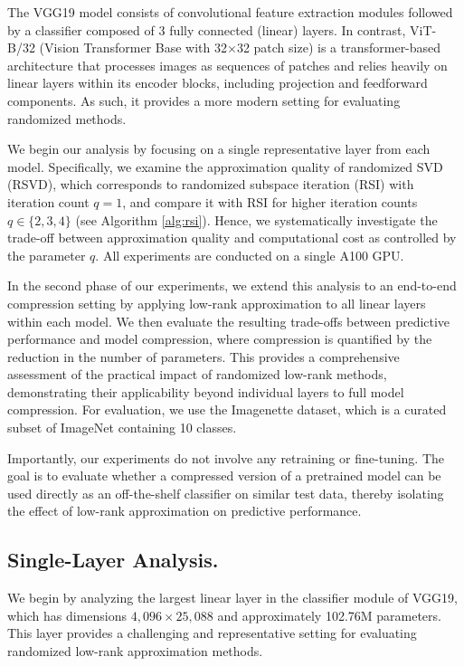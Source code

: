 \documentclass[twoside,leqno,onecolumn]{article}
\begin{document}
The VGG19 model consists of convolutional feature extraction modules followed by a classifier composed of 3 fully connected (linear) layers. In contrast, ViT-B/32 (Vision Transformer Base with 32$\times$32 patch size) is a transformer-based architecture that processes images as sequences of patches and relies heavily on linear layers within its encoder blocks, including projection and feedforward components. As such, it provides a  more modern setting for evaluating randomized methods.

We begin our analysis by focusing on a single representative layer from each model. Specifically, we examine the approximation quality of randomized SVD (RSVD), which corresponds to randomized subspace iteration (RSI) with iteration count $q=1$, and compare it with RSI for higher iteration counts $q\in\{2,3,4\}$ (see Algorithm \ref{alg:rsi}). Hence, we systematically investigate the trade-off between approximation quality and computational cost as controlled by the parameter 
$q$. All experiments are conducted on a single A100 GPU.

In the second phase of our experiments, we extend this analysis to an end-to-end compression setting by applying low-rank approximation to all linear layers within each model. We then evaluate the resulting trade-offs between predictive performance and model compression, where compression is quantified by the reduction in the number of parameters. This provides a comprehensive assessment of the practical impact of randomized low-rank methods, demonstrating their applicability beyond individual layers to full model compression. For evaluation, we use the Imagenette dataset, which is a curated subset of ImageNet containing 10 classes. 

Importantly, our experiments do not involve any retraining or fine-tuning. The goal is to evaluate whether a compressed version of a pretrained model can be used directly as an off-the-shelf classifier on similar test data, thereby isolating the effect of low-rank approximation on predictive performance.


\subsection{Single-Layer Analysis.}
We begin by analyzing the largest linear layer in the classifier module of \textsc{VGG19}, which has dimensions \(4{,}096 \times 25{,}088\) and approximately 102.76M parameters. This layer provides a challenging and representative setting for evaluating randomized low-rank approximation methods.
\end{document}
